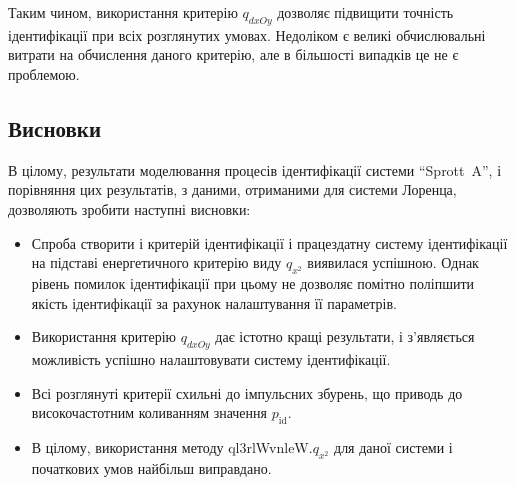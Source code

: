 Таким чином, використання критерію
$q_{dxOy}$ дозволяє підвищити точність ідентифікації при всіх
розглянутих умовах. Недоліком є великі обчислювальні витрати
на обчислення даного критерію, але в більшості випадків це не
є проблемою.



\subsection{Висновки}%

В цілому, результати моделювання процесів ідентифікації системи
``Sprott~A'', і порівняння цих результатів, з даними, отриманими для
системи Лоренца, дозволяють зробити наступні висновки:

\begin{itemize}

  \item
    Спроба створити і критерій ідентифікації і працездатну систему
    ідентифікації на підставі енергетичного критерію виду
    $q_{x^2}$ виявилася успішною. Однак рівень помилок ідентифікації
    при цьому не дозволяє помітно поліпшити якість ідентифікації
    за рахунок налаштування її параметрів.

  \item
    Використання критерію
    $q_{dxOy}$ дає істотно кращі результати, і з'являється можливість
    успішно налаштовувати систему ідентифікації.

  \item
    Всі розглянуті критерії схильні до імпульсних збурень, що
    приводь до високочастотним коливанням значення
    $p_{\mathrm{id}}$.

  \item
    В цілому, використання методу ql3rlWvnleW.$q_{x^2}$
    для даної системи і початкових умов найбільш виправдано.

\end{itemize}




